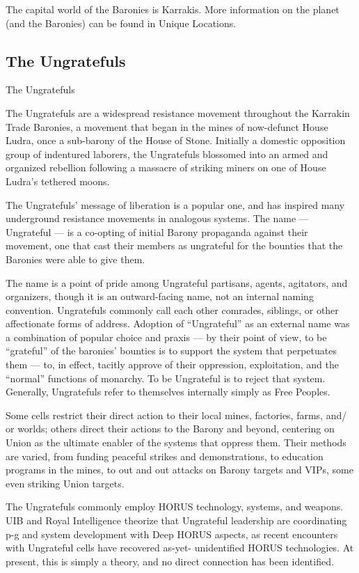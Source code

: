 The capital world of the Baronies is Karrakis. More information on the planet (and the Baronies)
can be found in Unique Locations.

\subsection{The Ungratefuls}
The Ungratefuls

The Ungratefuls are a widespread resistance movement throughout the Karrakin Trade Baronies,
a movement that began in the mines of now-defunct House Ludra, once a sub-barony of the
House of Stone. Initially a domestic opposition group of indentured laborers, the Ungratefuls
blossomed into an armed and organized rebellion following a massacre of striking miners on one
of House Ludra’s tethered moons.


The Ungratefuls’ message of liberation is a popular one, and has inspired many underground
resistance movements in analogous systems. The name — Ungrateful — is a co-opting of initial
Barony propaganda against their movement, one that cast their members as ungrateful for the
bounties that the Baronies were able to give them.


The name is a point of pride among Ungrateful partisans, agents, agitators, and organizers,
though it is an outward-facing name, not an internal naming convention. Ungratefuls commonly
call each other comrades, siblings, or other affectionate forms of address. Adoption of
“Ungrateful” as an external name was a combination of popular choice and praxis — by their
point of view, to be “grateful” of the baronies’ bounties is to support the system that perpetuates
them — to, in effect, tacitly approve of their oppression, exploitation, and the “normal” functions
of monarchy. To be Ungrateful is to reject that system. Generally, Ungratefuls refer to themselves
internally simply as Free Peoples.


Some cells restrict their direct action to their local mines, factories, farms, and/ or worlds; others
direct their actions to the Barony and beyond, centering on Union as the ultimate enabler of the
systems that oppress them. Their methods are varied, from funding peaceful strikes and
demonstrations, to education programs in the mines, to out and out attacks on Barony targets
and VIPs, some even striking Union targets.





The Ungratefuls commonly employ HORUS technology, systems, and weapons. UIB and Royal
Intelligence theorize that Ungrateful leadership are coordinating p-g and system development
with Deep HORUS aspects, as recent encounters with Ungrateful cells have recovered as-yet-
unidentified HORUS technologies. At present, this is simply a theory, and no direct connection
has been identified.


